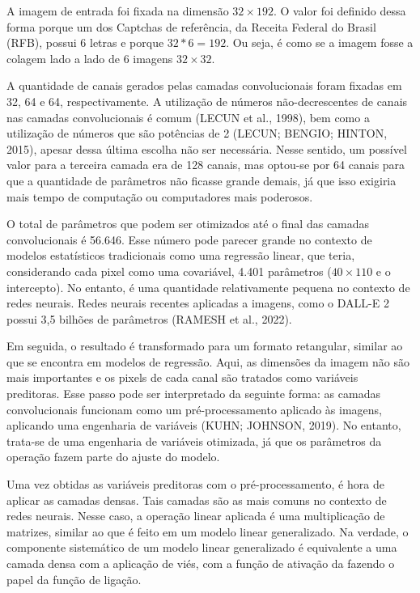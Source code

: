 \documentclass[12pt,twoside,brazilian]{book}
\begin{document}
A imagem de entrada foi fixada na dimensão \(32\times192\). O valor foi
definido dessa forma porque um dos Captchas de referência, da Receita
Federal do Brasil (RFB), possui 6 letras e porque \(32*6=192\). Ou seja,
é como se a imagem fosse a colagem lado a lado de 6 imagens
\(32\times32\).

A quantidade de canais gerados pelas camadas convolucionais foram
fixadas em 32, 64 e 64, respectivamente. A utilização de números
não-decrescentes de canais nas camadas convolucionais é comum (LECUN et
al., 1998), bem como a utilização de números que são potências de 2
(LECUN; BENGIO; HINTON, 2015), apesar dessa última escolha não ser
necessária. Nesse sentido, um possível valor para a terceira camada era
de 128 canais, mas optou-se por 64 canais para que a quantidade de
parâmetros não ficasse grande demais, já que isso exigiria mais tempo de
computação ou computadores mais poderosos.

O total de parâmetros que podem ser otimizados até o final das camadas
convolucionais é 56.646. Esse número pode parecer grande no contexto de
modelos estatísticos tradicionais como uma regressão linear, que teria,
considerando cada pixel como uma covariável, 4.401 parâmetros
(\(40\times110\) e o intercepto). No entanto, é uma quantidade
relativamente pequena no contexto de redes neurais. Redes neurais
recentes aplicadas a imagens, como o DALL-E 2 possui 3,5 bilhões de
parâmetros (RAMESH et al., 2022).

Em seguida, o resultado é transformado para um formato retangular,
similar ao que se encontra em modelos de regressão. Aqui, as dimensões
da imagem não são mais importantes e os pixels de cada canal são
tratados como variáveis preditoras. Esse passo pode ser interpretado da
seguinte forma: as camadas convolucionais funcionam como um
pré-processamento aplicado às imagens, aplicando uma engenharia de
variáveis (KUHN; JOHNSON, 2019). No entanto, trata-se de uma engenharia
de variáveis otimizada, já que os parâmetros da operação fazem parte do
ajuste do modelo.

Uma vez obtidas as variáveis preditoras com o pré-processamento, é hora
de aplicar as camadas densas. Tais camadas são as mais comuns no
contexto de redes neurais. Nesse caso, a operação linear aplicada é uma
multiplicação de matrizes, similar ao que é feito em um modelo linear
generalizado. Na verdade, o componente sistemático de um modelo linear
generalizado é equivalente a uma camada densa com a aplicação de viés,
com a função de ativação da fazendo o papel da função de ligação.
\end{document}
